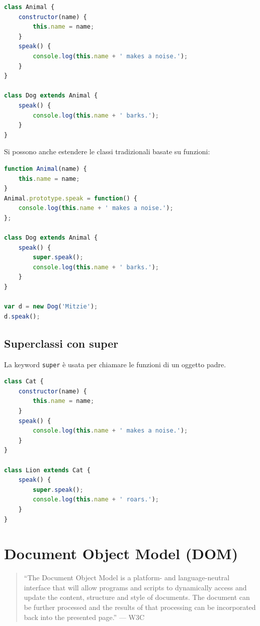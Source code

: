 \begin{lstlisting}[language=JavaScript]
class Animal {
    constructor(name) {
        this.name = name;
    }
    speak() {
        console.log(this.name + ' makes a noise.');
    }
}

class Dog extends Animal {
    speak() {
        console.log(this.name + ' barks.');
    }
}
\end{lstlisting}

Si possono anche estendere le classi tradizionali basate su funzioni:

\begin{lstlisting}[language=JavaScript]
function Animal(name) {
    this.name = name;
}
Animal.prototype.speak = function() {
    console.log(this.name + ' makes a noise.');
};

class Dog extends Animal {
    speak() {
        super.speak();
        console.log(this.name + ' barks.');
    }
}

var d = new Dog('Mitzie');
d.speak();
\end{lstlisting}

\subsection{Superclassi con super}

La keyword \texttt{super} è usata per chiamare le funzioni di un oggetto padre.

\begin{lstlisting}[language=JavaScript]
class Cat {
    constructor(name) {
        this.name = name;
    }
    speak() {
        console.log(this.name + ' makes a noise.');
    }
}

class Lion extends Cat {
    speak() {
        super.speak();
        console.log(this.name + ' roars.');
    }
}
\end{lstlisting}

\section{Document Object Model (DOM)}

\begin{quote}
``The Document Object Model is a platform- and language-neutral interface that will allow programs and scripts to dynamically access and update the content, structure and style of documents. The document can be further processed and the results of that processing can be incorporated back into the presented page.'' --- W3C
\end{quote}

